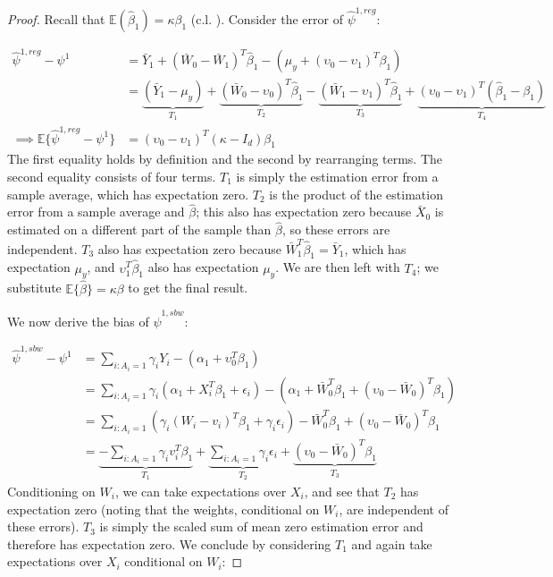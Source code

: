 \begin{proof}
Recall that $\mathbb{E}(\hat{\beta}_1) = \kappa\beta_1$ (c.l. \cite{gleser1992importance}). Consider the error of $\hat{\psi}^{1, reg}$: 

\begin{align*}
    \hat{\psi}^{1, reg} - \psi^1 &= \bar{Y}_1 + (\bar{W}_0 - \bar{W}_1)^T\hat{\beta}_1 - (\mu_y + (\upsilon_0 - \upsilon_1)^T\beta_1) \\
    &= \underbrace{(\bar{Y}_1 - \mu_y)}_{T_1} + \underbrace{(\bar{W}_0 - \upsilon_0)^T\hat{\beta}_1}_{T_2} - \underbrace{(\bar{W}_1 - \upsilon_1)^T\hat{\beta}_1}_{T_3} + \underbrace{(\upsilon_0 - \upsilon_1)^T(\hat{\beta}_1 - \beta_1)}_{T_4} \\
    \implies \mathbb{E}\{\hat{\psi}^{1, reg} - \psi^1\} &= (\upsilon_0 - \upsilon_1)^T(\kappa - I_d)\beta_1
\end{align*}
%
The first equality holds by definition and the second by rearranging terms. The second equality consists of four terms. $T_1$ is simply the estimation error from a sample average, which has expectation zero. $T_2$ is the product of the estimation error from a sample average and $\hat{\beta}$; this also has expectation zero because $\bar{X}_0$ is estimated on a different part of the sample than $\hat{\beta}$, so these errors are independent. $T_3$ also has expectation zero because $\bar{W}_1^T\hat{\beta}_1 = \bar{Y}_1$, which has expectation $\mu_y$, and $\upsilon_1^T\hat{\beta}_1$ also has expectation $\mu_y$. We are then left with $T_4$; we substitute $\mathbb{E}\{\hat{\beta}\} = \kappa\beta$ to get the final result. 

We now derive the bias of $\hat{\psi}^{1, sbw}$:

\begin{align*}
    \hat{\psi}^{1, sbw} - \psi^1 &= \sum_{i: A_i = 1}\gamma_iY_i - (\alpha_1 + \upsilon_0^T\beta_1) \\
    &= \sum_{i: A_i = 1} \gamma_i(\alpha_1 + X_i^T\beta_1 + \epsilon_i) - (\alpha_1 + \bar{W}_0^T\beta_1 + (\upsilon_0 - \bar{W}_0)^T\beta_1) \\
    &= \sum_{i: A_i = 1} (\gamma_i(W_i - v_i)^T\beta_1 + \gamma_i\epsilon_i) - \bar{W}_0^T\beta_1 + (\upsilon_0 - \bar{W}_0)^T\beta_1 \\
    &= \underbrace{-\sum_{i: A_i = 1}\gamma_iv_i^T\beta_1}_{T_1} + \underbrace{\sum_{i: A_i = 1}\gamma_i\epsilon_i}_{T_2}  + \underbrace{(\upsilon_0 - \bar{W}_0)^T\beta_1}_{T_3}
\end{align*}
%
Conditioning on $W_i$, we can take expectations over $X_i$, and see that $T_2$ has expectation zero (noting that the weights, conditional on $W_i$, are independent of these errors). $T_3$ is simply the scaled sum of mean zero estimation error and therefore has expectation zero. We conclude by considering $T_1$ and again take expectations over $X_i$ conditional on $W_i$: 


\end{proof}
